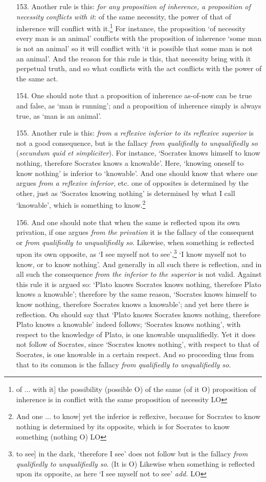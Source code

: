 \begin{itemize}
\item[153.] Another rule is this: \textit{for any proposition of inherence, a proposition of necessity conflicts with it}: of the same necessity, the power of that of inherence will conflict with it.\footnote{of ... with it] the possibility (possible O) of the same (of it O) proposition of inherence is in conflict with the same proposition of necessity LO} For instance, the proposition `of necessity every man is an animal' conflicts with the proposition of inherence `some man is not an animal' so it will conflict with `it is possible that some man is not an animal'. And the reason for this rule is this, that necessity bring with it perpetual truth, and so what conflicts with the act conflicts with the power of the same act.
\item[154.] One should note that a proposition of inherence as-of-now can be true and false, as `man is running'; and a proposition of inherence simply is always true, as `man is an animal'.
\item[155.] Another rule is this: \textit{from a reflexive inferior to its reflexive superior} is not a good consequence, but is the fallacy \textit{from qualifiedly to unqualifiedly so} (\textit{secundum quid et simpliciter}). For instance, `Socrates knows himself to know nothing, therefore Socrates knows a knowable'. Here, `knowing oneself to know nothing' is inferior to `knowable'. And one should know that where one argues \textit{from a reflexive inferior}, etc. one of opposites is determined by the other, just as `Socrates knowing nothing' is determined by what I call `knowable', which is something to know.\footnote{And one ... to know] yet the inferior is reflexive, because for Socrates to know nothing is determined by its opposite, which is for Socrates to know something (nothing O) LO}
\item[156.] And one should note that when the same is reflected upon its own privation, if one argues \textit{from the privation} it is the fallacy of the consequent or \textit{from qualifiedly to unqualifiedly so}. Likewise, when something is reflected upon its own opposite, as `I see myself not to see',\footnote{to see] in the dark, `therefore I see' does not follow but is the fallacy \textit{from qualifiedly to unqualifiedly so}. (It is O) Likewise when something is reflected upon its opposite, as here `I see myself not to see' \textit{add.} LO} `I know myself not to know, or to know nothing'. And generally in all such there is reflection, and in all such the consequence \textit{from the inferior to the superior} is not valid. Against this rule it is argued so: `Plato knows Socrates knows nothing, therefore Plato knows a knowable'; therefore by the same reason, `Socrates knows himself to know nothing, therefore Socrates knows a knowable'; and yet here there is reflection. On should say that `Plato knows Socrates knows nothing, therefore Plato knows a knowable' indeed follows; `Socrates knows nothing', with respect to the knowledge of Plato, is one knowable unqualifiedly. Yet it does not follow of Socrates, since `Socrates knows nothing', with respect to that of Socrates, is one knowable in a certain respect. And so proceeding thus from that to its common is the fallacy \textit{from qualifiedly to unqualifiedly so}. 

\end{itemize}
